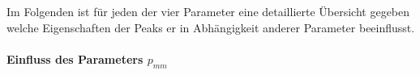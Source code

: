% 
% 
% 
% 

Im Folgenden ist für jeden der vier Parameter eine detaillierte Übersicht gegeben welche Eigenschaften der Peaks er in Abhängigkeit anderer Parameter beeinflusst.

\paragraph*{Einfluss des Parameters $p_{mm}$}


